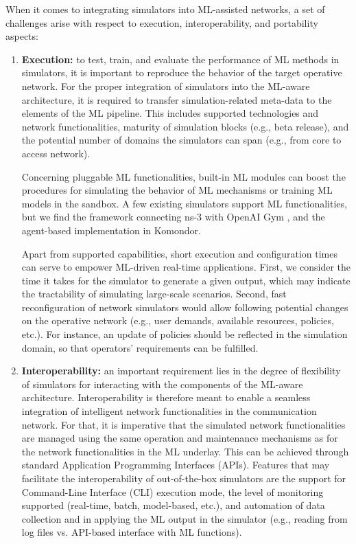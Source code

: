 \documentclass{article}
\begin{document}
	When it comes to integrating simulators into ML-assisted networks, a set of challenges arise with respect to execution, interoperability, and portability aspects:
	\begin{enumerate}
	    \item \textbf{Execution:} to test, train, and evaluate the performance of ML methods in simulators, it is important to reproduce the behavior of the target operative network. For the proper integration of simulators into the ML-aware architecture, it is required to transfer simulation-related meta-data to the elements of the ML pipeline. This includes supported technologies and network functionalities, maturity of simulation blocks (e.g., beta release), and the potential number of domains the simulators can span (e.g., from core to access network).
	            
	    Concerning pluggable ML functionalities, built-in ML modules can boost the procedures for simulating the behavior of ML mechanisms or training ML models in the sandbox. A few existing simulators support ML functionalities, but we find the framework connecting ns-3 with OpenAI Gym \cite{gawlowicz2019ns}, and the agent-based implementation in Komondor.
	    
        Apart from supported capabilities, short execution and configuration times can serve to empower ML-driven real-time applications. First, we consider the time it takes for the simulator to generate a given output, which may indicate the tractability of simulating large-scale scenarios. Second, fast reconfiguration of network simulators would allow following potential changes on the operative network (e.g., user demands, available resources, policies, etc.). For instance, an update of policies should be reflected in the simulation domain, so that operators' requirements can be fulfilled. 
        
        \item \textbf{Interoperability:} an important requirement lies in the degree of flexibility of simulators for interacting with the components of the ML-aware architecture. Interoperability is therefore meant to enable a seamless integration of intelligent network functionalities in the communication network. For that, it is imperative that the simulated network functionalities are managed using the same operation and maintenance mechanisms as for the network functionalities in the ML underlay. This can be achieved through standard Application Programming Interfaces (APIs). Features that may facilitate the interoperability of out-of-the-box simulators are the support for Command-Line Interface (CLI) execution mode, the level of monitoring supported (real-time, batch, model-based, etc.), and automation of data collection and in applying the ML output in the simulator (e.g., reading from log files vs. API-based interface with ML functions).


\end{enumerate}
\end{document}

